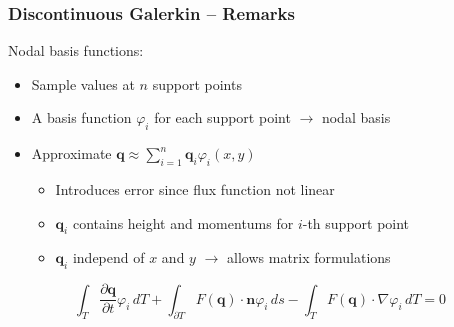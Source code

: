 \documentclass{beamer}
\newcommand{\pd}[2]{\dfrac{\partial #1}{\partial #2}}
\renewcommand{\phi}{\varphi}
\begin{document}
\begin{frame}
  \frametitle{Discontinuous Galerkin -- Remarks}

  Nodal basis functions:
  \begin{itemize}
  \item Sample values at $n$ support points
  \item A basis function $\phi_i$ for each support point $\rightarrow$ nodal basis
  \item Approximate
    $\mathbf{q} \approx \sum_{i=1}^n \mathbf{q}_i \phi_i(x,y)$
    \begin{itemize}
    \item Introduces error since flux function not linear 
    \item $\mathbf{q}_i$ contains height and momentums for $i$-th support point
    \item $\mathbf{q}_i$ independ of $x$ and $y$ $\rightarrow$ allows matrix formulations
    \end{itemize}
  \end{itemize}

  \begin{equation}
    \label{eq:shallow-water-phi-i}
    \int_T \pd {\mathbf{q}}{t} \phi_i \, dT +
    \int_{\partial T} F(\mathbf{q}) \cdot \mathbf{n} \phi_i \, ds -
    \int_T F(\mathbf{q}) \cdot \nabla \phi_i \, dT = 0
  \end{equation}
\end{frame}
\end{document}

